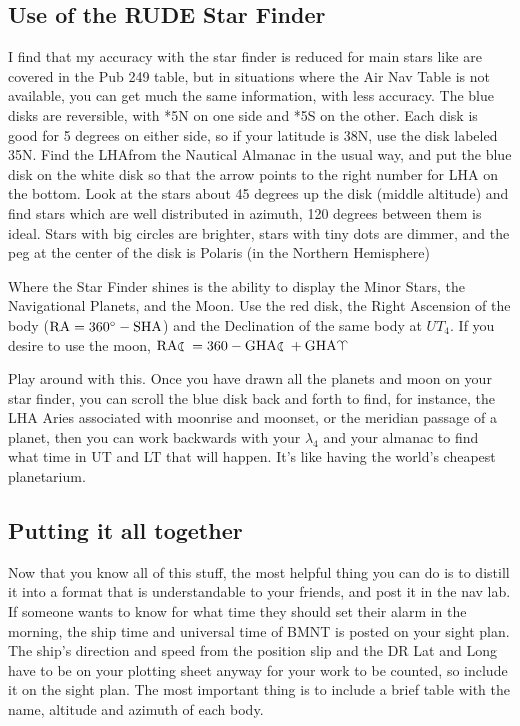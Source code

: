 \documentclass{article}
\begin{document}
\subsection{Use of the RUDE Star Finder}
I find that my accuracy with the star finder is reduced for main stars like are covered in the Pub 249 table, but in situations where the Air Nav Table is not available, you can get much the same information, with less accuracy. The blue disks are reversible, with *5N on one side and *5S on the other. Each disk is good for 5 degrees on either side, so if your latitude is 38N, use the disk labeled 35N. Find the LHA\aries from the Nautical Almanac in the usual way, and put the blue disk on the white disk so that the arrow points to the right number for LHA on the bottom. Look at the stars about 45 degrees up the disk (middle altitude) and find stars which are well distributed in azimuth, 120 degrees between them is ideal. Stars with big circles are brighter, stars with tiny dots are dimmer, and the peg at the center of the disk is Polaris (in the Northern Hemisphere)

Where the Star Finder shines is the ability to display the Minor Stars, the Navigational Planets, and the Moon. Use the red disk, the Right Ascension of the body (\(\text{RA}=360\degree-\text{SHA}\)) and the Declination of the same body at $UT_4$. If you desire to use the moon, \(\text{RA\leftmoon}=360-\text{GHA\leftmoon}+\text{GHA\aries}\)

Play around with this. Once you have drawn all the planets and moon on your star finder, you can scroll the blue disk back and forth to find, for instance, the LHA Aries associated with moonrise and moonset, or the meridian passage of a planet, then you can work backwards with your $\lambda_4$ and your almanac to find what time in UT and LT that will happen. It's like having the world's cheapest planetarium. 
\subsection{Putting it all together}
Now that you know all of this stuff, the most helpful thing you can do is to distill it into a format that is understandable to your friends, and post it in the nav lab. If someone wants to know for what time they should set their alarm in the morning, the ship time and universal time of BMNT is posted on your sight plan. The ship's direction and speed from the position slip and the DR Lat and Long have to be on your plotting sheet anyway for your work to be counted, so include it on the sight plan. The most important thing is to include a brief table with the name, altitude and azimuth of each body.
\end{document}
